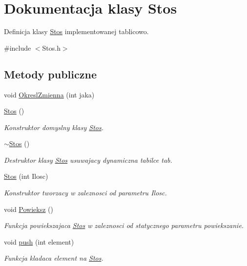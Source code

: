 \hypertarget{class_stos}{\section{Dokumentacja klasy Stos}
\label{class_stos}
}


Definicja klasy \hyperlink{class_stos}{Stos} implementowanej tablicowo.  




{\ttfamily \#include $<$Stos.\-h$>$}

\subsection*{Metody publiczne}
\begin{DoxyCompactItemize}
\item 
void \hyperlink{class_stos_ad4e60c6f49416147c80dd414bf1c536e}{Okresl\-Zmienna} (int jaka)
\item 
\hyperlink{class_stos_a1de3b50386d5dfb56ddece17d0ea2389}{Stos} ()
\begin{DoxyCompactList}\small\item\em Konstruktor domyslny klasy \hyperlink{class_stos}{Stos}. \end{DoxyCompactList}\item 
\hyperlink{class_stos_af9a198e2540e18adcc0b5259105fd78e}{$\sim$\-Stos} ()
\begin{DoxyCompactList}\small\item\em Destruktor klasy \hyperlink{class_stos}{Stos} usuwajacy dynamiczna tabilce tab. \end{DoxyCompactList}\item 
\hyperlink{class_stos_a1d276f8b01f9e4ce5d5595b1adb93e29}{Stos} (int Ilosc)
\begin{DoxyCompactList}\small\item\em Konstruktor tworzacy w zaleznosci od parametru Ilosc. \end{DoxyCompactList}\item 
void \hyperlink{class_stos_aea3524f54a7ad6a982dd1dc4cca48acb}{Powieksz} ()
\begin{DoxyCompactList}\small\item\em Funkcja powiekszajaca \hyperlink{class_stos}{Stos} w zaleznosci od statycznego parametru powiekszanie. \end{DoxyCompactList}\item 
void \hyperlink{class_stos_a03ec79affa2eae1a5f15efcd90f0b338}{push} (int element)
\begin{DoxyCompactList}\small\item\em Funkcja kladaca element na \hyperlink{class_stos}{Stos}. \end{DoxyCompactList}\item 

\end{DoxyCompactItemize}
